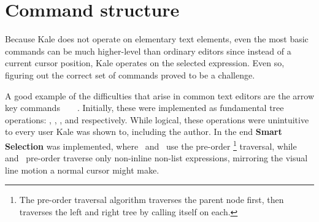 \section{Command structure}

Because Kale does not operate on elementary text elements, even the most
basic
commands can be much higher-level than ordinary editors since instead of a
current cursor position, Kale operates on the selected expression. Even so,
figuring out the correct set of commands proved to be a challenge.

A good example of the difficulties that arise in common text editors
are the arrow key commands~\ak{^}~~\ak{<}~\ak{>}.
Initially, these were implemented as
fundamental tree operations: , ,
, and  respectively.
While logical, these operations were unintuitive to every user
Kale was shown to, including the author. In the end \textbf{Smart Selection} was
implemented, where~\ak{<} and~\ak{>} use the pre-order%
%
\footnote{The pre-order traversal algorithm traverses the parent node first,
then traverses the left and right tree by calling itself on each.}
%
traversal, while~\ak{^} and~
pre-order traverse only non-inline non-list expressions, mirroring the visual
line motion a normal cursor might make.








